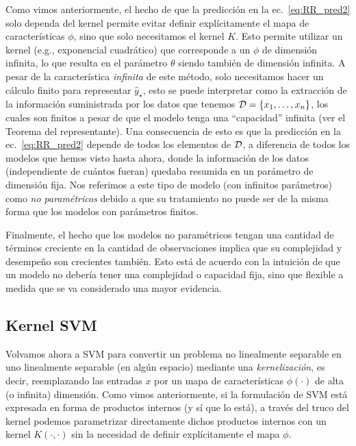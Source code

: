 \begin{remark} Como vimos anteriormente, el hecho de que la predicción en la ec.~\eqref{eq:RR_pred2} solo dependa del kernel permite evitar definir explícitamente el mapa de características $\phi$, sino que solo necesitamos el kernel $K$. Esto permite utilizar un kernel (e.g., exponencial cuadrático) que corresponde a un $\phi$ de dimensión infinita, lo que resulta en el parámetro $\theta$ siendo también de dimensión infinita. A pesar de la característica \emph{infinita} de este método, solo necesitamos hacer un cálculo finito para representar $\hat{y}_\star$, esto se puede interpretar como la extracción de la información suministrada por los datos que tenemos ${\mathcal D} = \{x_1,\ldots,x_n\}$, los cuales son finitos a pesar de que el modelo tenga una ``capacidad'' infinita (ver el Teorema del representante). Una consecuencia de esto es que la predicción en la ec.~\eqref{eq:RR_pred2} depende de todos los elementos de ${\mathcal D}$, a diferencia de todos los modelos que hemos visto hasta ahora, donde la información de los datos (independiente de cuántos fueran) quedaba resumida en un parámetro de dimensión fija. Nos referimos a este tipo de modelo (con infinitos parámetros) como \emph{no paramétricos} debido a que su tratamiento no puede ser de la misma forma que los modelos con parámetros finitos.  
\end{remark}

\begin{remark} 
Finalmente, el hecho que los modelos no paramétricos tengan una cantidad de términos creciente en la cantidad de observaciones implica que su complejidad y desempeño son crecientes también. Esto está de acuerdo con la intuición de que  un modelo no debería tener una complejidad o capacidad fija, sino que flexible a medida que se va considerado una mayor evidencia.
\end{remark}

\subsection{Kernel SVM}

Volvamos ahora a SVM para convertir un problema no linealmente separable en uno linealmente separable (en algún espacio) mediante una \emph{kernelización}, es decir, reemplazando las entradas $x$ por un mapa de características $\phi(\cdot)$ de alta (o infinita) dimensión. Como vimos anteriormente, si la formulación de SVM está expresada en forma de productos internos (y sí que lo está), a través del truco del kernel podemos parametrizar directamente dichos productos internos con un kernel $K(\cdot,\cdot)$ sin la necesidad de definir explícitamente el mapa $\phi$. 

